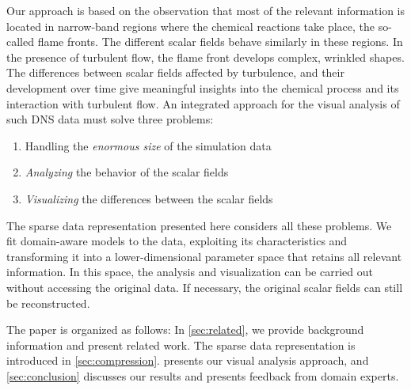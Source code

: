 Our approach is based on the observation that most of the relevant information
is located in narrow-band regions where the chemical reactions take place, the
so-called flame fronts. The different scalar fields behave similarly in these
regions. In the presence of turbulent flow, the flame front develops complex,
wrinkled shapes. The differences between scalar fields affected by turbulence,
and their development over time give meaningful insights into the chemical
process and its interaction with turbulent flow. An integrated approach for the
visual analysis of such \ac{DNS} data must solve three problems:
\begin{enumerate}
	\item \label{i:size} Handling the \emph{enormous size} of the simulation data
	\item \label{i:analyze} \emph{Analyzing} the behavior of the scalar fields
	\item \label{i:visualize} \emph{Visualizing} the differences between the scalar fields
\end{enumerate}
%
%
The sparse data representation presented here considers all these problems. We
fit domain-aware models to the data, exploiting its characteristics and
transforming it into a lower-dimensional parameter space that retains all
relevant information. In this space, the analysis and visualization can be
carried out without accessing the original data. If necessary, the original
scalar fields can still be reconstructed.

The paper is organized as follows: In \cref{sec:related}, we provide
background information and present related work. The sparse data representation
is introduced in \cref{sec:compression}. 
presents our visual analysis approach, and \cref{sec:conclusion}
discusses our results and presents feedback from domain experts.
